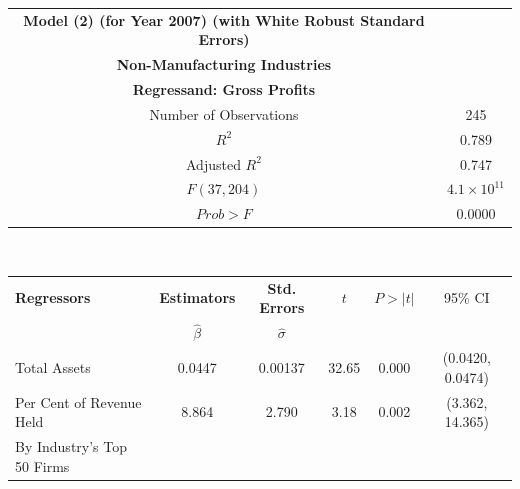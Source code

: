 \begin{table}[h]
\begin{tabular}{ c | c }
	\hline
	\textbf{Model (2) (for Year 2007) (with White Robust Standard Errors)} \\
    \textbf{Non-Manufacturing Industries} \\
    \textbf{Regressand: Gross Profits} \\
    \hline \hline
    Number of Observations & 245 \\
	\hline
    $R^{2}$ & 0.789 \\
    Adjusted $R^{2}$ & 0.747 \\
    \hline
    $F(37, 204)$ & $4.1 \times 10^{11}$ \\
    $Prob > F$ & 0.0000 \\
    \hline \hline
\end{tabular} \\

\begin{tabular}{ l | c | c | c | c | c }
	\hline
	\textbf{Regressors} & \textbf{Estimators} & \textbf{Std. Errors} & $t$ & $P > |t|$ & 95\% CI \\
    & $\hat{\beta}$ & $\hat{\sigma}$ & & & \\
    \hline \hline
	Total Assets & 0.0447 & 0.00137 & 32.65 & 0.000 & (0.0420, 0.0474) \\
	\hline
    Per Cent of Revenue Held & 8.864 & 2.790 & 3.18 & 0.002 & (3.362, 14.365) \\
    By Industry’s Top 50 Firms & & & & & \\
    \hline
    \hline \hline
\end{tabular}
\end{table}

